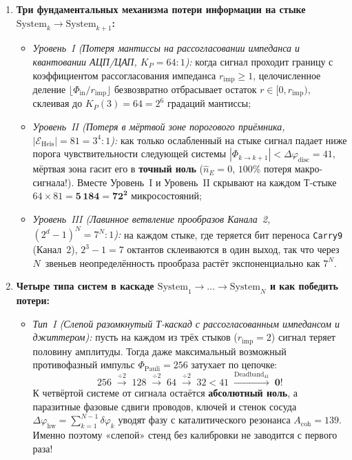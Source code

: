 \begin{enumerate}[label=\textbf{\arabic*.},leftmargin=*]
\item \textbf{Три фундаментальных механизма потери информации на стыке $\mathrm{System}_k \to \mathrm{System}_{k+1}$:}
  \begin{itemize}[noitemsep]
  \item \emph{Уровень~I (Потеря мантиссы на рассогласовании импеданса и квантовании АЦП/ЦАП, $K_P = 64 : 1$):}
    когда сигнал проходит границу с коэффициентом рассогласования импеданса $r_{\mathrm{imp}} \ge 1$, целочисленное деление $\lfloor \Phi_{\mathrm{in}} / r_{\mathrm{imp}}\rfloor$ безвозвратно отбрасывает остаток $r\in[0, r_{\mathrm{imp}})$, склеивая до $K_P(3) = 64 = 2^6$ градаций мантиссы;
  \item \emph{Уровень~II (Потеря в мёртвой зоне порогового приёмника, $|\mathcal{E}_{\mathrm{Heis}}| = 81 = 3^4 : 1$):}
    как только ослабленный на стыке сигнал падает ниже порога чувствительности следующей системы $|\Phi_{k\to k+1}| < \Delta\varphi_{\mathrm{disc}} = 41$, мёртвая зона гасит его в \textbf{точный ноль} ($\hat{n}_E = 0$, $100\%$ потеря макро-сигнала!). Вместе Уровень~I и Уровень~II скрывают на каждом Т-стыке $64\times 81 = \mathbf{5\,184 = 72^2}$ микросостояний;
  \item \emph{Уровень~III (Лавинное ветвление прообразов Канала~2, $(2^d - 1)^N = 7^N : 1$):}
    на каждом стыке, где теряется бит переноса \texttt{Carry9} (Канал~2), $2^3 - 1 = 7$ октантов склеиваются в один выход, так что через $N$~звеньев неопределённость прообраза растёт экспоненциально как $7^N$.
  \end{itemize}
\item \textbf{Четыре типа систем в каскаде $\mathrm{System}_1 \to \dots \to \mathrm{System}_N$ и как победить потери:}
  \begin{itemize}[noitemsep]
  \item \emph{Тип~I (Слепой разомкнутый Т-каскад с рассогласованным импедансом и джиттером):}
    пусть на каждом из трёх стыков ($r_{\mathrm{imp}} = 2$) сигнал теряет половину амплитуды. Тогда даже максимальный возможный противофазный импульс $\Phi_{\mathrm{Pauli}} = 256$ затухает по цепочке:
    \[
      256 \;\xrightarrow{\div 2}\; 128 \;\xrightarrow{\div 2}\; 64 \;\xrightarrow{\div 2}\; 32 < 41 \;\xrightarrow{\mathrm{Deadband}_{41}}\; \mathbf{0}!
    \]
    К четвёртой системе от сигнала остаётся \textbf{абсолютный ноль}, а паразитные фазовые сдвиги проводов, ключей и стенок сосуда $\Delta\varphi_{\mathrm{hw}} = \sum_{k=1}^{N-1}\delta\varphi_k$ уводят фазу с каталитического резонанса $A_{\mathrm{coh}} = 139$. Именно поэтому «слепой» стенд без калибровки не заводится с первого раза!

\end{itemize}
\end{enumerate}
